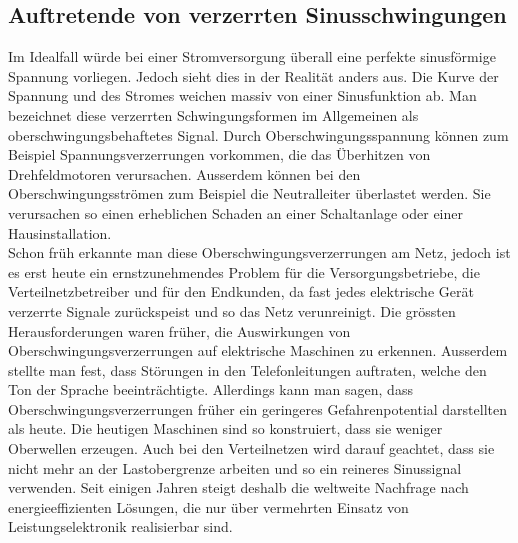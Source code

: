 \subsection{Auftretende von verzerrten Sinusschwingungen}
Im Idealfall würde bei einer Stromversorgung überall eine perfekte sinusförmige Spannung vorliegen. Jedoch sieht dies in der Realität anders aus. Die Kurve der Spannung und des Stromes weichen massiv von einer Sinusfunktion ab. Man bezeichnet diese verzerrten Schwingungsformen im Allgemeinen als oberschwingungsbehaftetes Signal. Durch Oberschwingungsspannung können zum Beispiel Spannungsverzerrungen vorkommen, die das Überhitzen von Drehfeldmotoren verursachen. Ausserdem können bei den Oberschwingungsströmen zum Beispiel die Neutralleiter überlastet werden. Sie verursachen so einen erheblichen Schaden an einer Schaltanlage oder einer Hausinstallation.\\
Schon früh erkannte man diese Oberschwingungsverzerrungen am Netz, jedoch ist es erst heute ein ernstzunehmendes Problem für die Versorgungsbetriebe, die Verteilnetzbetreiber und für den Endkunden, da fast jedes elektrische Gerät verzerrte Signale zurückspeist und so das Netz verunreinigt. Die grössten Herausforderungen waren früher, die Auswirkungen von Oberschwingungsverzerrungen auf elektrische Maschinen zu erkennen. Ausserdem stellte man fest, dass Störungen in den Telefonleitungen auftraten, welche den Ton der Sprache beeinträchtigte. Allerdings kann man sagen, dass Oberschwingungsverzerrungen früher ein geringeres Gefahrenpotential darstellten als heute. Die heutigen Maschinen sind so konstruiert, dass sie weniger Oberwellen erzeugen. Auch  bei den Verteilnetzen wird darauf geachtet, dass sie nicht mehr an der Lastobergrenze arbeiten und so ein reineres Sinussignal verwenden. Seit einigen Jahren steigt deshalb die weltweite Nachfrage nach energieeffizienten Lösungen, die nur über vermehrten Einsatz von Leistungselektronik realisierbar sind. 



